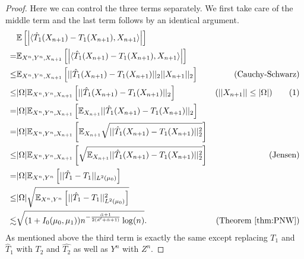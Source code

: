 \documentclass[nohyperref]{article}
\theoremstyle{definition}
\begin{document}
\begin{proof}
    Here we can control the three terms separately. We first take care of the middle term and the last term follows by an identical argument.
    \begin{align*}
        &\mathbb{E} \left [ \left | \langle \hat{T}_1(X_{n+1}) - T_1(X_{n+1}), X_{n+1} \rangle \right | \right ] \\
        =& \mathbb{E}_{X^n,Y^n, X_{n+1}} \left [ \left | \langle \hat{T}_1(X_{n+1}) - T_1(X_{n+1}), X_{n+1} \rangle \right | \right ] \\
        \leq& \mathbb{E}_{X^n,Y^n, X_{n+1}} \left [ ||\hat{T}_1(X_{n+1}) - T_1(X_{n+1})||_2||X_{n+1}||_2\right ] & (\text{Cauchy-Schwarz}) \\
        \leq& |\Omega|\mathbb{E}_{X^n,Y^n, X_{n+1}} \left [ ||\hat{T}_1(X_{n+1}) - T_1(X_{n+1})||_2\right ] & (||X_{n+1}|| \leq |\Omega|) \stepcounter{equation}\tag{\theequation}\label{eq:term_copy} \\
        =& |\Omega|\mathbb{E}_{X^n,Y^n, X_{n+1}}\left [ \mathbb{E}_{X_{n+1}} ||\hat{T}_1(X_{n+1}) - T_1(X_{n+1})||_2 \right ] \\
        =& |\Omega|\mathbb{E}_{X^n,Y^n, X_{n+1}}\left [ \mathbb{E}_{X_{n+1}} \sqrt{||\hat{T}_1(X_{n+1}) - T_1(X_{n+1})||_2^2} \right ] \\ 
        \leq& |\Omega|\mathbb{E}_{X^n,Y^n, X_{n+1}}\left [ \sqrt{\mathbb{E}_{X_{n+1}} ||\hat{T}_1(X_{n+1}) - T_1(X_{n+1})||_2^2} \right ] & (\text{Jensen})\\
        =&|\Omega|\mathbb{E}_{X^n,Y^n} \left [ ||\hat{T}_1 - T_1||_{L^2(\mu_0)} \right ] \\
        \leq& |\Omega|\sqrt{\mathbb{E}_{X^n,Y^n}\left [ ||\hat{T}_1 - T_1||_{L^2(\mu_0)}^2 \right ]} \\
        \lesssim& \sqrt{(1+I_0(\mu_0,\mu_1))n^{-\frac{\Bar{\alpha}+ 1}{2(d' + \Bar{\alpha} + 1)}}\log(n)}. & (\text{Theorem \ref{thm:PNW}})
    \end{align*}
    As mentioned above the third term is exactly the same except replacing $T_1$ and $\hat{T}_1$ with $T_2$ and $\hat{T_2}$ as well as $Y^n$ with $Z^n$.
    

\end{proof}
\end{document}
